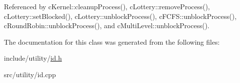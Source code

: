 \-Referenced by c\-Kernel\-::cleanup\-Process(), c\-Lottery\-::remove\-Process(), c\-Lottery\-::set\-Blocked(), c\-Lottery\-::unblock\-Process(), c\-F\-C\-F\-S\-::unblock\-Process(), c\-Round\-Robin\-::unblock\-Process(), and c\-Multi\-Level\-::unblock\-Process().



\-The documentation for this class was generated from the following files\-:\begin{DoxyCompactItemize}
\item 
include/utility/\hyperlink{id_8h}{id.\-h}\item 
src/utility/id.\-cpp\end{DoxyCompactItemize}
